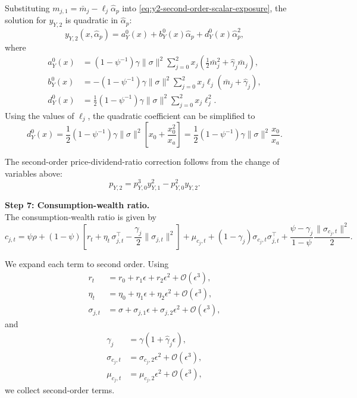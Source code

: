Substituting $m_{j,1}=\bar{m}_j-\ell_j\hat{\alpha}_p$ into \eqref{eq:y2-second-order-scalar-exposure}, the solution for $y_{Y,2}$ is quadratic in $\hat{\alpha}_p$:
\begin{equation}\label{eq:y2-quadratic-alpha-fixed}
    y_{Y,2}(x,\hat{\alpha}_p)
    = a_Y^{0}(x)+b_Y^{0}(x)\hat{\alpha}_p+d_Y^{0}(x)\hat{\alpha}_p^2,
\end{equation}
where
\begin{align}
    a_Y^{0}(x)
    &= (1-\psi^{-1})\gamma\|\sigma\|^2
    \sum_{j=0}^2 x_j\left(
        \frac{1}{2}\bar{m}_j^2+\hat{\gamma}_j\bar{m}_j
    \right),\\
    b_Y^{0}(x)
    &= -(1-\psi^{-1})\gamma\|\sigma\|^2
    \sum_{j=0}^2 x_j\ell_j\left(\bar{m}_j+\hat{\gamma}_j\right),\\
    d_Y^{0}(x)
    &= \frac{1}{2}(1-\psi^{-1})\gamma\|\sigma\|^2
    \sum_{j=0}^2 x_j\ell_j^2.
\end{align}
Using the values of $\ell_j$, the quadratic coefficient can be simplified to
\begin{equation}\label{eq:dY0-fixed-alpha-simplified}
    d_Y^{0}(x)
    = \frac{1}{2}(1-\psi^{-1})\gamma\|\sigma\|^2
    \left[x_0+\frac{x_0^2}{x_a}\right]
    = \frac{1}{2}(1-\psi^{-1})\gamma\|\sigma\|^2\frac{x_0}{x_a}.
\end{equation}

The second-order price-dividend-ratio correction follows from the change of variables above:
\begin{equation}
    p_{Y,2}=p_{Y,0}^3 y_{Y,1}^2-p_{Y,0}^2 y_{Y,2}.
\end{equation}


\noindent\textbf{Step 7: Consumption-wealth ratio.}\\
The consumption-wealth ratio is given by
\begin{equation}
    c_{j,t} = \psi \rho 
    + (1-\psi) \left[ r_t + \eta_{t}\,\sigma_{j,t}^\top - \frac{\gamma_j}{2} \|\sigma_{j,t}\|^2 \right] 
    + \mu_{c_j,t} 
    + (1-\gamma_j) \sigma_{c_j,t} \sigma_{j,t}^\top 
    + \frac{\psi - \gamma_j}{1-\psi} \frac{\|\sigma_{c_j,t}\|^2}{2}.
\end{equation}

We expand each term to second order.
Using
\begin{align}
    r_t &= r_0 + r_1\epsilon + r_2\epsilon^2 + \mathcal{O}(\epsilon^3),\\
    \eta_t &= \eta_0 + \eta_1\epsilon + \eta_2\epsilon^2 + \mathcal{O}(\epsilon^3),\\
    \sigma_{j,t} &= \sigma + \sigma_{j,1}\epsilon + \sigma_{j,2}\epsilon^2 + \mathcal{O}(\epsilon^3),
\end{align}
and
\begin{align}
    \gamma_j &= \gamma(1+\hat{\gamma}_j\epsilon), \\
    \sigma_{c_j,t} &= \sigma_{c_j,2}\epsilon^2 + \mathcal{O}(\epsilon^3), \\
    \mu_{c_j,t} &= \mu_{c_j,2}\epsilon^2 + \mathcal{O}(\epsilon^3),
\end{align}
we collect second-order terms.

